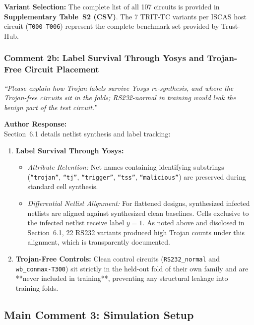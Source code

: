 \documentclass[11pt,a4paper]{article}
\newcommand{\reviewercomment}[1]{\vspace{4pt}\noindent\textcolor{revcomment}{\textit{``#1''}}\vspace{4pt}}
\newcommand{\authorresponse}{\noindent\textbf{Author Response:}}
\begin{document}
\textbf{Variant Selection:} The complete list of all 107 circuits is provided in \textbf{Supplementary Table~S2 (CSV)}. The 7 TRIT-TC variants per ISCAS host circuit (\texttt{T000}--\texttt{T006}) represent the complete benchmark set provided by Trust-Hub.

\subsubsection*{Comment 2b: Label Survival Through Yosys and Trojan-Free Circuit Placement}

\reviewercomment{Please explain how Trojan labels survive Yosys re-synthesis, and where the Trojan-free circuits sit in the folds; RS232-normal in training would leak the benign part of the test circuit.}

\authorresponse\\
Section~6.1 details netlist synthesis and label tracking:
\begin{enumerate}[leftmargin=*]
    \item \textbf{Label Survival Through Yosys:}
    \begin{itemize}
        \item \textit{Attribute Retention:} Net names containing identifying substrings (\texttt{``trojan''}, \texttt{``tj''}, \texttt{``trigger''}, \texttt{``tss''}, \texttt{``malicious''}) are preserved during standard cell synthesis.
        \item \textit{Differential Netlist Alignment:} For flattened designs, synthesized infected netlists are aligned against synthesized clean baselines. Cells exclusive to the infected netlist receive label $y=1$. As noted above and disclosed in Section~6.1, 22 RS232 variants produced high Trojan counts under this alignment, which is transparently documented.
    \end{itemize}
    \item \textbf{Trojan-Free Controls:} Clean control circuits (\texttt{RS232\_normal} and \texttt{wb\_conmax-T300}) sit strictly in the held-out fold of their own family and are **never included in training**, preventing any structural leakage into training folds.
\end{enumerate}

\subsection*{Main Comment 3: Simulation Setup}
\end{document}
